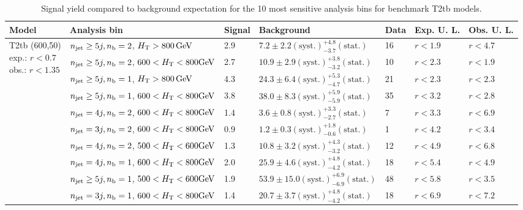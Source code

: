 \begin{table}[h!] 
  \scriptsize
  \caption{ 
Signal yield compared to background expectation for the 10 most sensitive analysis bins 
for benchmark T2tb models.
  \label{tab:sigBenchmarksYields_T2tb}}
  \centering 
  \begin{tabular}{ lllllll } 
    \hline 
    \hline 
    Model & Analysis bin & Signal & Background & Data & Exp. U. L. & Obs. U. L. \\ \hline
\multirow{10}{*}{\parbox[t]{2cm}{T2tb (600,50)\\exp.: $r<0.7$\\obs.: $r<1.35$}}
 & $n_{\mathrm{jet}} \geq5j,n_{\text{b}} =2$, $\mbox{$H_\text{T}$} > 800 \, \mathrm{GeV}$ & 2.9 & $7.2 \pm 2.2 \mathrm{(syst.)} ^{+4.8}_{-3.7} \mathrm{(stat.)}$ & 16 & $r < 1.9$ & $r < 4.7$\\ 
 & $n_{\mathrm{jet}} \geq5j,n_{\text{b}} =2$, $600 < \mbox{$H_\text{T}$} < 800 \mathrm{GeV}$ & 2.7 & $10.9 \pm 2.9 \mathrm{(syst.)} ^{+3.8}_{-3.2} \mathrm{(stat.)}$ & 10 & $r < 2.3$ & $r < 1.9$\\ 
 & $n_{\mathrm{jet}} \geq5j,n_{\text{b}} =1$, $\mbox{$H_\text{T}$} > 800 \, \mathrm{GeV}$ & 4.3 & $24.3 \pm 6.4 \mathrm{(syst.)} ^{+5.3}_{-4.7} \mathrm{(stat.)}$ & 21 & $r < 2.3$ & $r < 2.3$\\ 
 & $n_{\mathrm{jet}} \geq5j,n_{\text{b}} =1$, $600 < \mbox{$H_\text{T}$} < 800 \mathrm{GeV}$ & 3.8 & $38.0 \pm 8.3 \mathrm{(syst.)} ^{+5.9}_{-5.9} \mathrm{(stat.)}$ & 35 & $r < 3.2$ & $r < 2.8$\\ 
 & $n_{\mathrm{jet}} =4j,n_{\text{b}} =2$, $600 < \mbox{$H_\text{T}$} < 800 \mathrm{GeV}$ & 1.4 & $3.6 \pm 0.8 \mathrm{(syst.)} ^{+3.3}_{-2.7} \mathrm{(stat.)}$ & 7 & $r < 3.3$ & $r < 6.9$\\ 
 & $n_{\mathrm{jet}} =3j,n_{\text{b}} =2$, $600 < \mbox{$H_\text{T}$} < 800 \mathrm{GeV}$ & 0.9 & $1.2 \pm 0.3 \mathrm{(syst.)} ^{+1.8}_{-0.6} \mathrm{(stat.)}$ & 1 & $r < 4.2$ & $r < 3.4$\\ 
 & $n_{\mathrm{jet}} =4j,n_{\text{b}} =2$, $500 < \mbox{$H_\text{T}$} < 600 \mathrm{GeV}$ & 1.3 & $10.8 \pm 3.2 \mathrm{(syst.)} ^{+4.3}_{-3.2} \mathrm{(stat.)}$ & 12 & $r < 4.9$ & $r < 6.8$\\ 
 & $n_{\mathrm{jet}} =4j,n_{\text{b}} =1$, $600 < \mbox{$H_\text{T}$} < 800 \mathrm{GeV}$ & 2.0 & $25.9 \pm 4.6 \mathrm{(syst.)} ^{+4.8}_{-4.2} \mathrm{(stat.)}$ & 18 & $r < 5.4$ & $r < 4.9$\\ 
 & $n_{\mathrm{jet}} \geq5j,n_{\text{b}} =1$, $500 < \mbox{$H_\text{T}$} < 600 \mathrm{GeV}$ & 1.9 & $53.9 \pm 15.0 \mathrm{(syst.)} ^{+6.9}_{-6.9} \mathrm{(stat.)}$ & 48 & $r < 5.8$ & $r < 3.5$\\ 
 & $n_{\mathrm{jet}} =3j,n_{\text{b}} =1$, $600 < \mbox{$H_\text{T}$} < 800 \mathrm{GeV}$ & 1.4 & $20.7 \pm 3.7 \mathrm{(syst.)} ^{+4.8}_{-4.2} \mathrm{(stat.)}$ & 18 & $r < 6.9$ & $r < 7.2$\\ \hline

\end{tabular}
\end{table}

